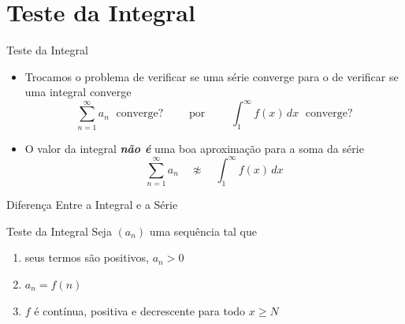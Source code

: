 \section{Teste da Integral}

\begin{frame}{Teste da Integral}
  \begin{itemize}
    \item Trocamos o problema de verificar se uma série converge para o de
    verificar se uma integral converge
    \[ \sum_{n=1}^{\infty} a_n  \;\text{ converge?}
       \qquad \text{ por } \qquad
       \int_{1}^{\infty} f(x) \,dx  \;\text{ converge?}
    \]
    \pause
    \item O valor da integral \emph{\textbf{não é}} uma boa aproximação para a soma da série
    \[ \sum_{n=1}^{\infty} a_n  \quad \not\approx \quad \int_{1}^{\infty} f(x) \,dx\]
  \end{itemize}
\end{frame}

\begin{frame}{Diferença Entre a Integral e a Série}
  \begin{center}
    
  \end{center}
\end{frame}
\begin{frame}[t]{Teste da Integral}
  Seja $(a_n)$ uma sequência tal que
  \begin{enumerate}[<+->]
    \item seus termos são positivos, $a_n>0$
    \item $a_n=f(n)$
    \item $f$ é contínua, positiva e decrescente para todo $x \geq N$
  \end{enumerate}

\end{frame}

